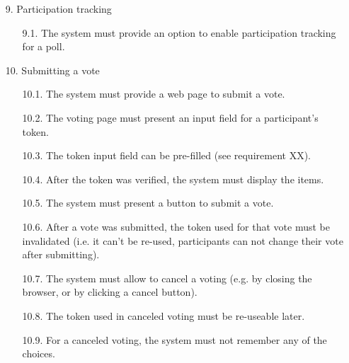 \begin{enumerate}
\item[9.] Participation tracking

	\begin{enumerate}
	\item[9.1.] The system must provide an option to enable participation tracking for a poll. %
	
	
	\end{enumerate}




\item[10.] Submitting a vote

	\begin{enumerate}
	\item[10.1.] The system must provide a web page to submit a vote. %
	
	
	\item[10.2.] The voting page must present an input field for a participant’s token. %
	
	
	\item[10.3.] The token input field can be pre-filled (see requirement XX). %
	
	
	\item[10.4.] After the token was verified, the system must display the items. %
	
	
	\item[10.5.] The system must present a button to submit a vote. %
	
	
	\item[10.6.] After a vote was submitted, the token used for that vote must be invalidated (i.e. it can’t be
	re-used, participants can not change their vote after submitting). %
	
	
	\item[10.7.] The system must allow to cancel a voting (e.g. by closing the browser, or by clicking a cancel
	button). %
	
	
	\item[10.8.] The token used in canceled voting must be re-useable later. %
	
	
	\item[10.9.] For a canceled voting, the system must not remember any of the choices. %
	
	
	\end{enumerate}





\end{enumerate}
